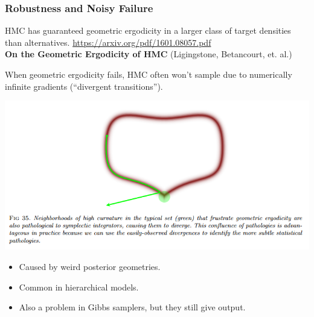\documentclass[xcolor=dvipsnames]{beamer}
\begin{document}
\begin{frame}
\frametitle{Robustness and Noisy Failure}
HMC has guaranteed geometric ergodicity in a larger class of target densities than alternatives. {\scriptsize \url{https://arxiv.org/pdf/1601.08057.pdf} \\\textbf{On the Geometric Ergodicity of HMC} (Ligingstone, Betancourt, et. al.) }

\vspace{0.5cm}

When geometric ergodicity fails, HMC often won't sample due to numerically infinite gradients (``divergent transitions'').
\begin{center}
\includegraphics[height = 0.4\textheight]{divergent.png}
\end{center}
\begin{itemize}
\item Caused by weird posterior geometries.
\item Common in hierarchical models.
\item Also a problem in Gibbs samplers, but they still give output.
\end{itemize}
\end{frame}
\end{document}
